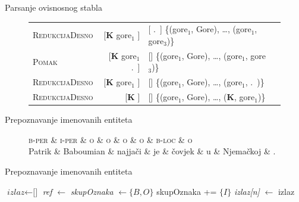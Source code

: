 \documentclass{beamer}
\begin{document}
\begin{frame}{Parsanje ovisnosnog stabla}
\begin{figure}
\begin{tabular}{l|rlm{4cm}}
    \textsc{RedukcijaDesno}   & {[}\textbf{K} gore$_1$ {]}                          & {[} .~{]}                                                                   \qquad \{(gore$_1$, Gore), \ldots, (gore$_1$, gore$_3$)\}  \\
    \textsc{Pomak}            & {[}\textbf{K} gore$_1$ .~{]}                        & {[}{]}                                                                      \qquad \{(gore$_1$, Gore), \ldots, (gore$_1$, gore$_3$)\}  \\
    \textsc{RedukcijaDesno}   & {[}\textbf{K} gore$_1$ {]}                          & {[}{]}                                                                      \qquad \{(gore$_1$, Gore), \ldots, (gore$_1$, .~)\}  \\
    \textsc{RedukcijaDesno}   & {[}\textbf{K} {]}                                   & {[}{]}                                                                      \qquad \{(gore$_1$, Gore), \ldots, (\textbf{K}, gore$_1$)\}  \\
    \end{tabular}
  \end{figure}
\end{frame}

\begin{frame}{Prepoznavanje imenovanih entiteta}
  \begin{figure}[H]
  \centering
  \begin{dependency}
  \begin{deptext}
    \textsc{b-per} \& \textsc{i-per} \& \textsc{o} \& \textsc{o} \& \textsc{o} \& \textsc{o} \& \textsc{b-loc} \& \textsc{o} \\
    Patrik         \& Baboumian      \& najjači    \& je         \& čovjek     \& u          \& Njemačkoj      \& .          \\
  \end{deptext}
  \end{dependency}
  \end{figure}
\end{frame}

\begin{frame}{Prepoznavanje imenovanih entiteta}
  \begin{algorithm}[H]
  \begin{algorithmic}[1]
  \State $\textit{izlaz} \gets \text{[]}$
    \State \textit{ref} $\gets$ 
    \State \textit{skupOznaka} $\gets \{B,O\}$
      \State skupOznaka += $\{I\}$
    \EndIf
    \State \textit{izlaz[n]} $\gets$ 
  \EndFor
  \State {}
  \Return izlaz
  \EndFunction
  \end{algorithmic}
  \end{algorithm}
\end{frame}
\end{document}
